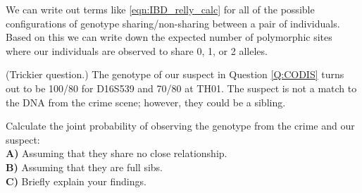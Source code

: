 {{We can write out terms like \eqn \eqref{eqn:IBD_relly_calc} for all of
the possible configurations of genotype
sharing/non-sharing between a pair of individuals. Based on this we can write down the expected number of
polymorphic sites where our individuals are observed to share 0, 1, or 2
alleles.

\begin{question}{ (Trickier question.)}
The genotype of our suspect in Question \ref{Q:CODIS} turns out to be 100/80 for
D16S539 and 70/80 at TH01. The suspect is not a match to the DNA
from the crime scene; however, they could be a sibling.

Calculate the joint probability of observing the genotype from the crime and our
suspect:\\
{\bf A)} Assuming that they share no close relationship.\\

{\bf B)} Assuming that they are full sibs.\\

{\bf C)} Briefly explain your findings.
  \end{question}



}}
